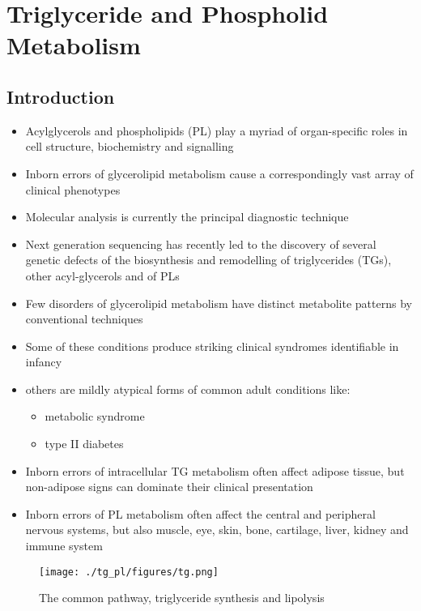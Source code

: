 \documentclass{scrartcl}
\begin{document}
\section{Triglyceride and Phospholid Metabolism}
\label{sec:orgf0172fd}
\subsection{Introduction}
\label{sec:org761f294}
\begin{itemize}
\item Acylglycerols and phospholipids (PL) play a myriad of organ-specific
roles in cell structure, biochemistry and signalling
\item Inborn errors of glycerolipid metabolism cause a correspondingly
vast array of clinical phenotypes
\item Molecular analysis is currently the principal diagnostic
technique

\item Next generation sequencing has recently led to the discovery of
several genetic defects of the biosynthesis and remodelling of
triglycerides (TGs), other acyl-glycerols and of PLs

\item Few disorders of glycerolipid metabolism have distinct metabolite
patterns by conventional techniques
\item Some of these conditions produce striking clinical syndromes
identifiable in infancy
\item others are mildly atypical forms of common adult conditions like:
\begin{itemize}
\item metabolic syndrome
\item type II diabetes
\end{itemize}
\item Inborn errors of intracellular TG metabolism often affect adipose
tissue, but non-adipose signs can dominate their clinical
presentation
\item Inborn errors of PL metabolism often affect the central and
peripheral nervous systems, but also muscle, eye, skin, bone,
cartilage, liver, kidney and immune system
\end{itemize}

\begin{figure}[htbp]
\centering
\texttt{[image: ./tg\_pl/figures/tg.png]}
\caption{\label{fig:org8e8e6ba}
The common pathway, triglyceride synthesis and lipolysis}
\end{figure}
\end{document}
